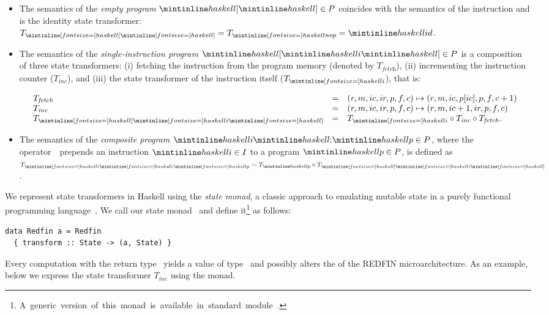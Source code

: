 \begin{itemize}
    \item The semantics of the \emph{empty program} $\hs{[}\hs{]} \in P$ coincides with
    the semantics of the instruction  and is the identity state transformer:
    $T_{\subhs{[}\subhs{]}} = T_{\subhs{nop}} = \hs{id}$.
    
    \item The semantics of the \emph{single-instruction program} $\hs{[}\hs{i}\hs{]} \in P$
    is a composition of three state transformers: (i) fetching the instruction from
    the program memory (denoted by $T_\textit{fetch}$), (ii) incrementing the
    instruction counter ($T_\textit{inc}$), and (iii) the state transformer
    of the instruction itself ($T_{\subhs{i}}$), that is:
    
    \[
    \begin{array}{lcl}
    T_\textit{fetch} & = & (r, m, ic, ir, p, f, c) \mapsto (r, m, ic, p[ic], p, f, c + 1)\\
    T_\textit{inc} & = & (r, m, ic, ir, p, f, c) \mapsto (r, m, ic + 1, ir, p, f, c)\\
    T_{\subhs{[}\subhs{i}\subhs{]}} & = & T_{\subhs{i}} \circ T_\textit{inc} \circ T_\textit{fetch}.\\
    \end{array}
    \]
    
    \item The semantics of the \emph{composite program} $\hs{i}\hs{:}\hs{p} \in P$,
    where the operator~\hs{:}~prepends an instruction $\hs{i} \in I$ to a program
    $\hs{p} \in P$, is defined as $T_{\subhs{i}\subhs{:}\subhs{p}} = T_{\hs{p}} \circ T_{\subhs{[}\subhs{i}\subhs{]}}$.
    
\end{itemize}

\noindent
We represent state transformers in Haskell using the \emph{state monad}, a
classic approach to emulating mutable state in a purely functional programming
language~\cite{wadler1990comprehending}. We call our state monad~ and
define it\footnote{\mbox{A generic version of this monad is available in standard module
.}} as follows:


\begin{verbatim}
data Redfin a = Redfin
  { transform :: State -> (a, State) }
\end{verbatim}


\noindent
Every computation with the return type~  yields a value of type~
and possibly alters the  of the REDFIN microarchitecture. As an example,
below we express the state transformer $T_\textit{inc}$ using the  monad.


